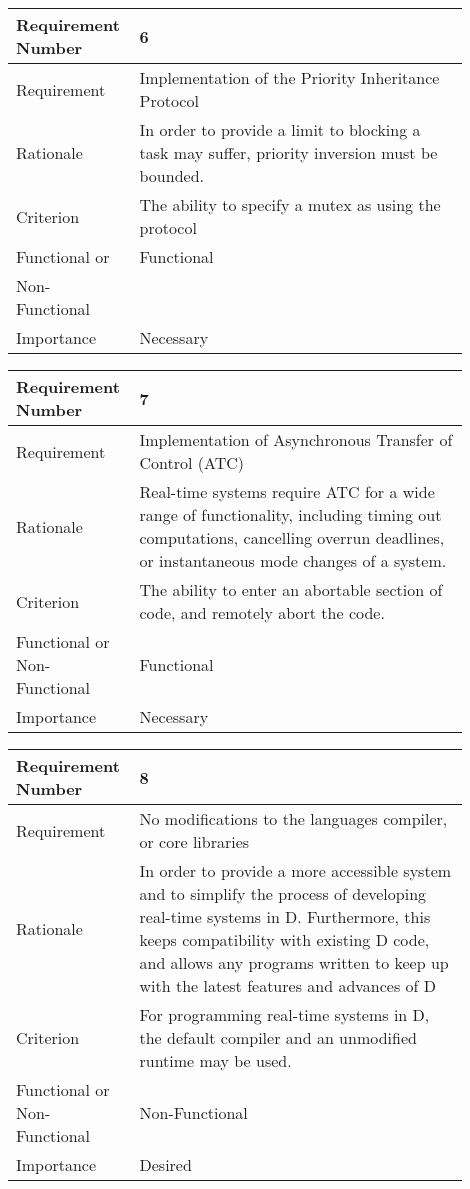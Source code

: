 \begin{table}[!htbp]
\centering
\begin{tabular}{|L{0.2\linewidth}|L{0.7\linewidth}|}
\hline
Requirement Number & 6 \\ \hline
Requirement & Implementation of the Priority Inheritance Protocol \\ \hline
Rationale      & In order to provide a limit to blocking a task may suffer, priority 
                inversion must be bounded. \\ \hline
Criterion      & The ability to specify a mutex as using the protocol\\ \hline
Functional or  & Functional \\
Non-Functional & \\ \hline
Importance     & Necessary \\ \hline
\end{tabular}
\end{table}
\begin{table}[!htbp]
\centering
\begin{tabular}{|L{0.2\linewidth}|L{0.7\linewidth}|}
\hline
Requirement Number & 7 \\ \hline
Requirement & Implementation of Asynchronous Transfer of Control (ATC) \\ \hline
Rationale      & Real-time systems require ATC for a wide range of functionality, 
                including timing out computations, cancelling overrun deadlines,  
                or instantaneous mode changes of a system. \\ \hline
Criterion      & The ability to enter an abortable section of code, and remotely  
                abort the code. \\ \hline
Functional or Non-Functional & Functional \\ \hline
Importance     & Necessary \\ \hline
\end{tabular}
\end{table}
\begin{table}[!htbp]
\centering
\begin{tabular}{|L{0.2\linewidth}|L{0.7\linewidth}|}
\hline
Requirement Number & 8 \\ \hline
Requirement & No modifications to the languages compiler, or core libraries \\ \hline
Rationale      & In order to provide a more accessible system and to simplify the 
                process of developing real-time systems in D. Furthermore, this 
                keeps compatibility with existing D code, and allows any programs  
                written to keep up with the latest features and advances of D \\ \hline
Criterion      & For programming real-time systems in D, the default compiler and  
                an unmodified runtime may be used. \\ \hline
Functional or Non-Functional & Non-Functional \\ \hline
Importance     & Desired \\ \hline
\end{tabular}
\end{table}
